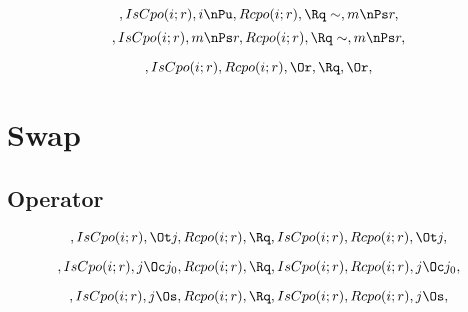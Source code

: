 \bigskip
\bigskip





\[, IsCpo(i;r), i \nPu, Rcpo(i;r), \Rq \sim, m \nPs r, \]
\[, IsCpo(i;r), m \nPs r, Rcpo(i;r), \Rq \sim, m \nPs r, \]

\[, IsCpo(i;r), Rcpo(i;r), \Or, \Rq , \Or, \]



\bigskip
\bigskip
\section{Swap}
\subsection{Operator}
\[, IsCpo(i;r), \Ot j, Rcpo(i;r), \Rq , IsCpo(i;r), Rcpo(i;r), \Ot j, \]

\[, IsCpo(i;r), j \Oc j_0, Rcpo(i;r), \Rq , IsCpo(i;r), Rcpo(i;r), j \Oc j_0, \]

\[, IsCpo(i;r), j \Os, Rcpo(i;r), \Rq , IsCpo(i;r), Rcpo(i;r), j \Os, \]


